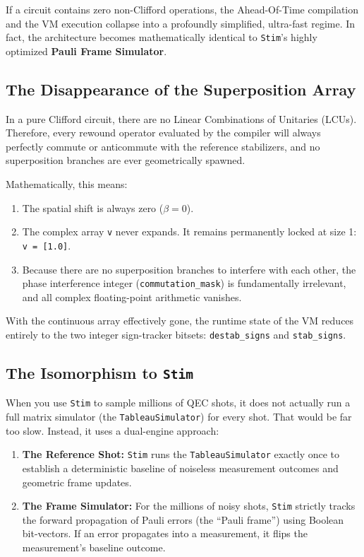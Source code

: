\documentclass[11pt]{article}
\begin{document}
If a circuit contains zero non-Clifford operations, the Ahead-Of-Time compilation and the VM execution collapse into a profoundly simplified, ultra-fast regime. In fact, the architecture becomes mathematically identical to \texttt{Stim}'s highly optimized \textbf{Pauli Frame Simulator}.

\subsection{The Disappearance of the Superposition Array}
In a pure Clifford circuit, there are no Linear Combinations of Unitaries (LCUs). Therefore, every rewound operator evaluated by the compiler will always perfectly commute or anticommute with the reference stabilizers, and no superposition branches are ever geometrically spawned.

Mathematically, this means:
\begin{enumerate}
    \item The spatial shift is always zero ($\beta = 0$).
    \item The complex array \texttt{v} never expands. It remains permanently locked at size 1: \texttt{v = [1.0]}.
    \item Because there are no superposition branches to interfere with each other, the phase interference integer (\texttt{commutation\_mask}) is fundamentally irrelevant, and all complex floating-point arithmetic vanishes.
\end{enumerate}
With the continuous array effectively gone, the runtime state of the VM reduces entirely to the two integer sign-tracker bitsets: \texttt{destab\_signs} and \texttt{stab\_signs}.

\subsection{The Isomorphism to \texttt{Stim}}
When you use \texttt{Stim} to sample millions of QEC shots, it does not actually run a full matrix simulator (the \texttt{TableauSimulator}) for every shot. That would be far too slow. Instead, it uses a dual-engine approach:
\begin{enumerate}
    \item \textbf{The Reference Shot:} \texttt{Stim} runs the \texttt{TableauSimulator} exactly once to establish a deterministic baseline of noiseless measurement outcomes and geometric frame updates.
    \item \textbf{The Frame Simulator:} For the millions of noisy shots, \texttt{Stim} strictly tracks the forward propagation of Pauli errors (the ``Pauli frame'') using Boolean bit-vectors. If an error propagates into a measurement, it flips the measurement's baseline outcome.
\end{enumerate}
\end{document}

